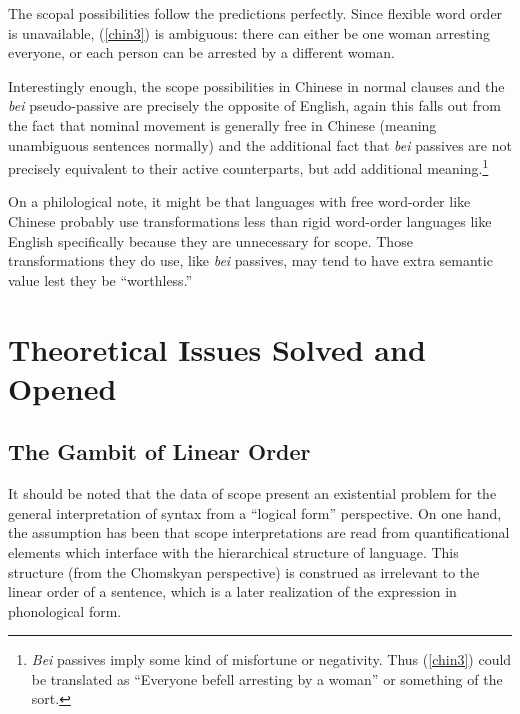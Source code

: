 \documentclass{article}
\begin{document}
\begin{exe}
\end{exe}

The scopal possibilities follow the predictions perfectly. Since flexible word order is unavailable, (\ref{chin3}) is ambiguous: there can either be one woman arresting everyone, or each person can be arrested by a different woman.

Interestingly enough, the scope possibilities in Chinese in normal clauses and the \emph{bei} pseudo-passive are precisely the opposite of English, again this falls out from the fact that nominal movement is generally free in Chinese (meaning unambiguous sentences normally) and the additional fact that \emph{bei} passives are not precisely equivalent to their active counterparts, but add additional meaning.\footnote{\emph{Bei} passives imply some kind of misfortune or negativity. Thus (\ref{chin3}) could be translated as ``Everyone befell arresting by a woman'' or something of the sort.}

On a philological note, it might be that languages with free word-order like Chinese probably use transformations less than rigid word-order languages like English specifically because they are unnecessary for scope. Those transformations they do use, like \emph{bei} passives, may tend to have extra semantic value lest they be ``worthless.''


\section{Theoretical Issues Solved and Opened}

\subsection{The Gambit of Linear Order}

It should be noted that the data of scope present an existential problem for the general interpretation of syntax from a ``logical form'' perspective. On one hand, the assumption has been that scope interpretations are read from quantificational elements which interface with the hierarchical structure of language. This structure (from the Chomskyan perspective) is construed as irrelevant to the linear order of a sentence, which is a later realization of the expression in phonological form.
\end{document}
